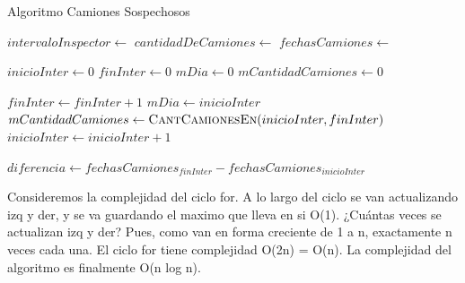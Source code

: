 \documentclass[11pt, a4paper, twoside]{article}
\begin{document}
\begin{algorithm}[H]
\caption{Algoritmo Camiones Sospechosos}\label{camionessospechosos}
\footnotesize\begin{algorithmic}[1]
	\Require
		\Statex $intervaloInspector \gets$  
		\Statex $cantidadDeCamiones \gets$  
		\Statex $fechasCamiones \gets$  
	\Ensure
		\Statex {} 
		\Statex {} 
	\Statex
	
  \State {} 
  \State $inicioInter \gets 0$ 
  \State $finInter \gets 0$ 
  \State $mDia \gets 0$ 
  \State $mCantidadCamiones \gets 0$ 

   
      \State $ finInter \gets finInter+1$
    \EndWhile 
   
    \State $ mDia \gets inicioInter$ 
    \State $ mCantidadCamiones \gets \Call{CantCamionesEn}{inicioInter,finInter}$ 
  \EndIf {}
  \State $inicioInter \gets inicioInter +1$
  \EndWhile {}
  \State {}
  \State


  \State {} 
	\EndFunction {}
  \State

    \State $diferencia \gets fechasCamiones_{finInter} - fechasCamiones_{inicioInter}$ 
    \State {} 
	\EndFunction {}

	\Statex{}
\end{algorithmic}
\end{algorithm}


Consideremos la complejidad del ciclo for. A lo largo del ciclo se van
actualizando izq y der, y se va guardando el maximo que lleva  en si O(1).
¿Cuántas veces se actualizan izq y der? Pues, como van en forma creciente de 1 a
n, exactamente n veces cada una. El ciclo for tiene complejidad O(2n) = O(n). La
complejidad del algoritmo es finalmente O(n log n).
\end{document}
